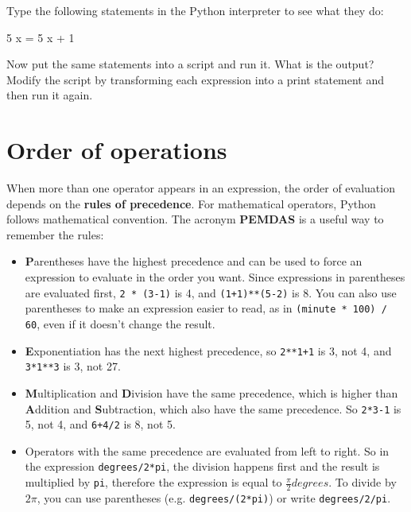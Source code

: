 \begin{exercise}
Type the following statements in the Python interpreter to see
what they do:

\beforeverb
\begin{pyexo}
5
x = 5
x + 1
\end{pyexo}
\afterverb
%
Now put the same statements into a script and run it.  What
is the output?  Modify the script by transforming each
expression into a print statement and then run it again.
\end{exercise}


\section{Order of operations}

When more than one operator appears in an expression, the order of
evaluation depends on the {\bf rules of precedence}.  For
mathematical operators, Python follows mathematical convention.
The acronym {\bf PEMDAS} is a useful way to
remember the rules:


\begin{itemize}

\item {\bf P}arentheses have the highest precedence and can be used 
to force an expression to evaluate in the order you want. Since
expressions in parentheses are evaluated first, {\tt 2 * (3-1)} is 4,
and {\tt (1+1)**(5-2)} is 8. You can also use parentheses to make an
expression easier to read, as in {\tt (minute * 100) / 60}, even
if it doesn't change the result.

\item {\bf E}xponentiation has the next highest precedence, so
{\tt 2**1+1} is 3, not 4, and {\tt 3*1**3} is 3, not 27.

\item {\bf M}ultiplication and {\bf D}ivision have the same precedence,
which is higher than {\bf A}ddition and {\bf S}ubtraction, which also
have the same precedence.  So {\tt 2*3-1} is 5, not 4, and
{\tt 6+4/2} is 8, not 5.

\item Operators with the same precedence are evaluated from left to 
right.  So in the expression {\tt degrees/2*pi}, the division
happens first and the result is multiplied by {\tt pi}, therefore the expression is equal to $\frac{\pi}{2}degrees$. To divide by $2 \pi$, you can use parentheses (e.g. {\tt degrees/(2*pi)}) or write {\tt degrees/2/pi}.

\end{itemize}


